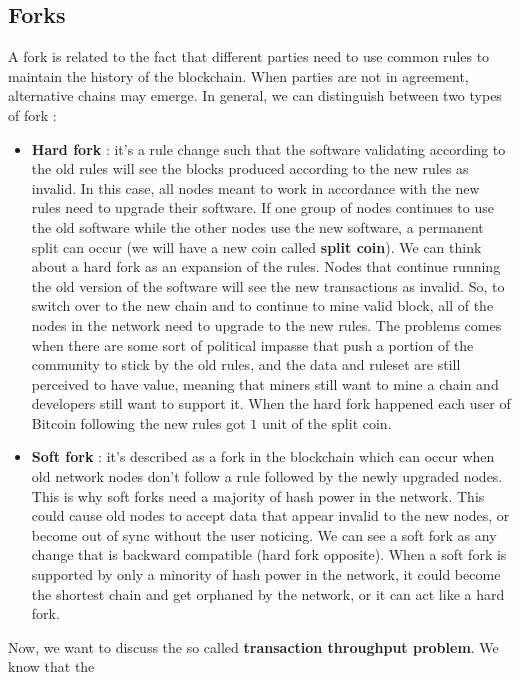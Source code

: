 \subsection{Forks}
A fork is related to the fact that different parties need to use common rules to maintain the history of the blockchain. When parties are not in agreement, alternative chains may emerge. In general, we can distinguish between two types of fork :
\begin{itemize}
\item \textbf{Hard fork} : it's a rule change such that the software validating according to the old rules will see the blocks produced according to the new rules as invalid. In this case, all nodes meant to work in accordance with the new rules need to upgrade their software. If one group of nodes continues to use the old software while the other nodes use the new software, a permanent split can occur (we will have a new coin called \textbf{split coin}). We can think about a hard fork as an expansion of the rules. Nodes that continue running the old version of the software will see the new transactions as invalid. So, to switch over to the new chain and to continue to mine valid block, all of the nodes in the network need to upgrade to the new rules. The problems comes when there are some sort of political impasse that push a portion of the community to stick by the old rules, and the data and ruleset are still perceived to have value, meaning that miners still want to mine a chain and developers still want to support it. When the hard fork happened each user of Bitcoin following the new rules got $1$ unit of the split coin.
\item \textbf{Soft fork} : it's described as a fork in the blockchain which can occur when old network nodes don't follow a rule followed by the newly upgraded nodes. This is why soft forks need a majority of hash power in the network. This could cause old nodes to accept data that appear invalid to the new nodes, or become out of sync without the user noticing. We can see a soft fork as any change that is backward compatible (hard fork opposite). When a soft fork is supported by only a minority of hash power in the network, it could become the shortest chain and get orphaned by the network, or it can act like a hard fork.
\end{itemize}
Now, we want to discuss the so called \textbf{transaction throughput problem}. We know that the 
